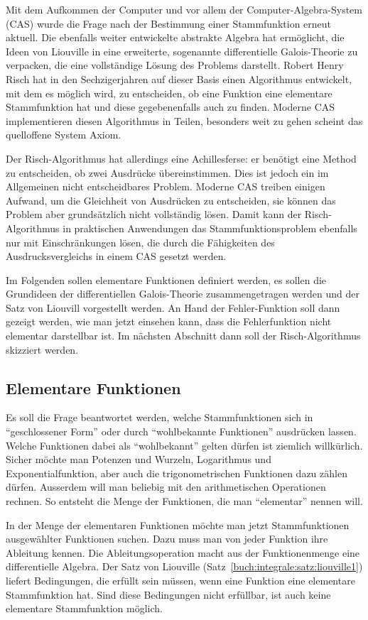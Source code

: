 Mit dem Aufkommen der Computer und vor allem der Computer-Algebra-System (CAS)
wurde die Frage nach der Bestimmung einer Stammfunktion erneut aktuell.
Die ebenfalls weiter entwickelte abstrakte Algebra hat ermöglicht, die
Ideen von Liouville in eine erweiterte, sogenannte differentielle 
Galois-Theorie zu verpacken, die eine vollständige Lösung des Problems
darstellt.
Robert Henry Risch hat in den Sechzigerjahren auf dieser Basis
einen Algorithmus entwickelt, mit dem es möglich wird, zu entscheiden,
ob eine Funktion eine elementare Stammfunktion hat und diese
gegebenenfalls auch zu finden.
Moderne CAS implementieren diesen Algorithmus
in Teilen, besonders weit zu gehen scheint das quelloffene System
Axiom.

Der Risch-Algorithmus hat allerdings eine Achillesferse: er benötigt
eine Method zu entscheiden, ob zwei Ausdrücke übereinstimmen.
Dies ist jedoch ein im Allgemeinen nicht entscheidbares Problem.
Moderne CAS treiben einigen Aufwand, um die
Gleichheit von Ausdrücken zu entscheiden, sie können das Problem
aber grundsätzlich nicht vollständig lösen.
Damit kann der Risch-Algorithmus in praktischen Anwendungen das
Stammfunktionsproblem ebenfalls nur mit Einschränkungen lösen,
die durch die Fähigkeiten des Ausdrucksvergleichs in einem CAS
gesetzt werden.

Im Folgenden sollen elementare Funktionen definiert werden, es sollen
die Grundideen der differentiellen Galois-Theorie zusammengetragen werden
und der Satz von Liouvill vorgestellt werden.
An Hand der Fehler-Funktion soll dann gezeigt werden, wie man jetzt
einsehen kann, dass die Fehlerfunktion nicht elementar darstellbar ist.
Im nächsten Abschnitt dann soll der Risch-Algorithmus skizziert werden.

\subsection{Elementare Funktionen
\label{buch:integrale:section:elementar}}
Es soll die Frage beantwortet werden, welche Stammfunktionen sich
in ``geschlossener Form'' oder durch ``wohlbekannte Funktionen''
ausdrücken lassen.
Welche Funktionen dabei als ``wohlbekannt'' gelten dürfen ist
ziemlich willkürlich.
Sicher möchte man Potenzen und Wurzeln, Logarithmus und Exponentialfunktion,
aber auch die trigonometrischen Funktionen dazu zählen dürfen.
Ausserdem will man beliebig mit den arithmetischen Operationen
rechnen.
So entsteht die Menge der Funktionen, die man ``elementar'' nennen
will.

In der Menge der elementaren Funktionen möchte man jetzt
Stammfunktionen ausgewählter Funktionen suchen.
Dazu muss man von jeder Funktion ihre Ableitung kennen.
Die Ableitungsoperation macht aus der Funktionenmenge eine
differentielle Algebra.
Der Satz von Liouville (Satz~\ref{buch:integrale:satz:liouville1}) 
liefert Bedingungen, die erfüllt sein müssen, wenn eine Funktion
eine elementare Stammfunktion hat.
Sind diese Bedingungen nicht erfüllbar, ist auch keine 
elementare Stammfunktion möglich.

